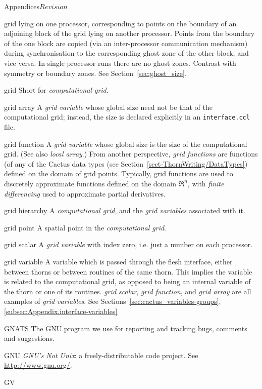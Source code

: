\begin{cactuspart}{Appendices}{}{$Revision$}
\begin{Lentry}
  grid lying on one processor, corresponding to points on the boundary
  of an adjoining block of the grid lying on another processor.
  Points from the boundary of the one block are copied (via an
  inter-processor communication mechanism) during synchronisation
  to the corresponding ghost zone of the other block, and vice versa.
  In single processor runs there are no ghost zones.
  Contrast with symmetry or boundary zones.
  See Section~\ref{sec:ghost_size}.
\item[grid]
  Short for \textit{computational grid}.
\item[grid array]
  A \textit{grid variable} whose global size need not be that of the
  computational grid; instead, the size is declared explicitly in an
  \verb|interface.ccl| file.  
\item[grid function]
  A \textit{grid variable} whose global size is the size of the
  computational grid.  (See also \textit{local array}.)
  From another perspective,
  \textit{grid functions} are functions (of any of the Cactus
  data types (see Section~\ref{sect-ThornWriting/DataTypes})
  defined on the domain of grid points.
  Typically, grid functions are used to discretely approximate functions
  defined on the domain $\Re^n$, with \textit{finite differencing}
  used to approximate partial derivatives.
\item[grid hierarchy]
  A \textit{computational grid}, and the \textit{grid variables} associated
  with it.
\item[grid point]
  A spatial point in the \textit{computational grid}.
\item[grid scalar]
  A \textit{grid variable} with index zero,
  i.e. just a number on each processor.
\item[grid variable]
  A variable which is passed through the flesh interface, either between 
  thorns or between routines of the same thorn.
  This implies the variable is related to the computational grid, as opposed
  to being an internal variable of the thorn or one of its routines. 
  \textit{grid scalar}, \textit{grid function}, and \textit{grid array}
  are all examples of \textit{grid variables}. 
  See Sections~\ref{sec:cactus_variables-groups},
  \ref{subsec:Appendix.interface-variables}
\item[GNATS]
  The GNU program we use for reporting and tracking bugs, comments and
  suggestions.
\item[GNU]
  \textit{GNU's Not Unix}: a freely-distributable code project.  
  See \url{http://www.gnu.org/}.
\item[GV]

\end{Lentry}
\end{cactuspart}
